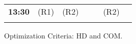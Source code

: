 \documentclass[twocolumn,natbib]{svjour3}          %
\begin{document}
\begin{figure*}
\begin{subfigure}{.5\textwidth}
{\begin{tabular}{|c||P{1.4cm}|P{1.4cm}|P{1.4cm}|P{1.4cm}|P{1.4cm}|p{.9cm}}
				\textbf{13:30}   &    (R1)                         &    (R2)                       &                           &     &     (R2)                                &   \\
		\end{tabular}}
		\caption{Optimization Criteria: HD and COM.}
		\label{fig:aftermaybe}
	\end{subfigure}%
	\begin{subfigure}{.5\textwidth}
		\centering
\end{subfigure}
\end{figure*}
\end{document}
